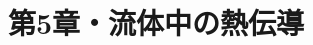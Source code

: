 \documentclass{ltjsarticle}
\title{第5章・流体中の熱伝導}
\date{\DTMnow}
\begin{document}
\maketitle



\hypertarget{targetofBackToTheToc}{}
\tableofcontents

\setcounter{section}{48}











\end{document}

